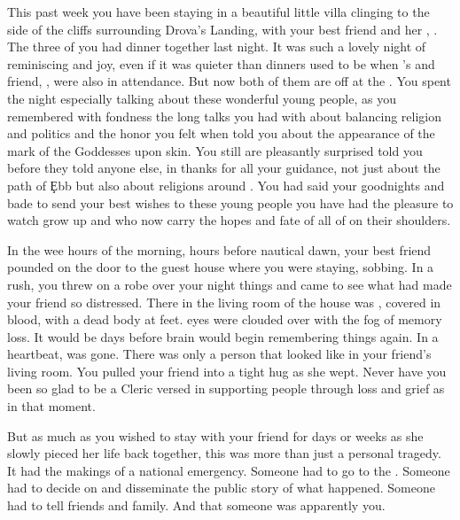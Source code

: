 \documentclass[char]{GL2020}
\begin{document}
This past week you have been staying in a beautiful little villa clinging to the side of the cliffs surrounding Drova’s Landing, with your best friend and her \cHeadDiplomat{\spouse}, \cHeadDiplomat{}. The three of you had dinner together last night. It was such a lovely night of reminiscing and joy, even if it was quieter than dinners used to be when \cHeadDiplomat{}’s \cPresident{\nibling} \cPresident{\full} and \cPresident{\their} friend, \cInitiate{\full}, were also in attendance. But now both of them are off at the \pSc{}. You spent the night especially talking about these wonderful young people, as you remembered with fondness the long talks you had with \cPresident{} about balancing religion and politics and the honor you felt when \cInitiate{} told you about the appearance of the mark of the Goddesses upon \cInitiate{\their} skin. You still are pleasantly surprised \cInitiate{} told you before they told anyone else, in thanks for all your guidance, not just about the path of \c Ebb{} but also about religions around \pEarth{}. You had said your goodnights and bade \cHeadDiplomat{} to send your best wishes to these young people you have had the pleasure to watch grow up and who now carry the hopes and fate of all of \pEarth{} on their shoulders.

In the wee hours of the morning, hours before nautical dawn, your best friend pounded on the door to the guest house where you were staying, sobbing. In a rush, you threw on a robe over your night things and came to see what had made your friend so distressed. There in the living room of the house was \cHeadDiplomat{}, covered in blood, with a dead body at \cHeadDiplomat{\their} feet. \cHeadDiplomat{\Their} eyes were clouded over with the fog of memory loss. It would be days before \cHeadDiplomat{\their} brain would begin remembering things again. In a heartbeat, \cHeadDiplomat{} was gone. There was only a person that looked like \cHeadDiplomat{\them} in your friend’s living room. You pulled your friend into a tight hug as she wept. Never have you been so glad to be a Cleric versed in supporting people through loss and grief as in that moment. 

But as much as you wished to stay with your friend for days or weeks as she slowly pieced her life back together, this was more than just a personal tragedy. It had the makings of a national emergency. Someone had to go to the \pSchool{}. Someone had to decide on and disseminate the public story of what happened. Someone had to tell \cHeadDiplomat{\their} friends and family. And that someone was apparently you.
\end{document}

